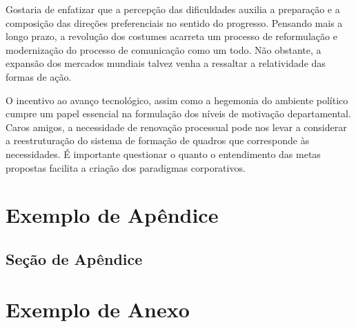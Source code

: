 \documentclass[a5paper,10pt]{udesc}
\begin{document}
          Gostaria de enfatizar que a percepção das dificuldades auxilia a preparação e a composição das direções preferenciais no sentido do progresso. Pensando mais a longo prazo, a revolução dos costumes acarreta um processo de reformulação e modernização do processo de comunicação como um todo. Não obstante, a expansão dos mercados mundiais talvez venha a ressaltar a relatividade das formas de ação. 

          O incentivo ao avanço tecnológico, assim como a hegemonia do ambiente político cumpre um papel essencial na formulação dos níveis de motivação departamental. Caros amigos, a necessidade de renovação processual pode nos levar a considerar a reestruturação do sistema de formação de quadros que corresponde às necessidades. É importante questionar o quanto o entendimento das metas propostas facilita a criação dos paradigmas corporativos. 



\apendice

\chapter{Exemplo de Apêndice}
\section{Seção de Apêndice}

\anexo

\chapter{Exemplo de Anexo}
\end{document}

